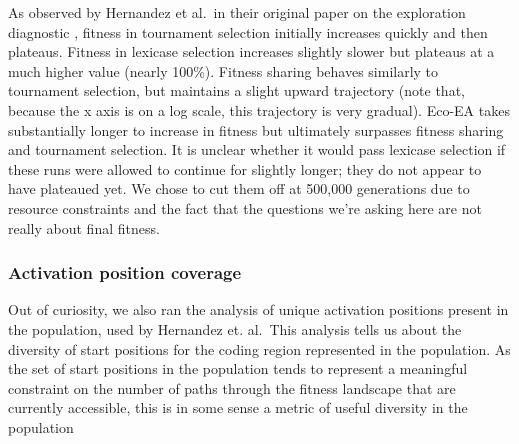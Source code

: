 \documentclass[]{book}
\begin{document}
As observed by Hernandez et al.~in their original paper on the exploration diagnostic \citep{hernandez_ExplorationExplorationMeasuring_2021}, fitness in tournament selection initially increases quickly and then plateaus. Fitness in lexicase selection increases slightly slower but plateaus at a much higher value (nearly 100\%). Fitness sharing behaves similarly to tournament selection, but maintains a slight upward trajectory (note that, because the x axis is on a log scale, this trajectory is very gradual). Eco-EA takes substantially longer to increase in fitness but ultimately surpasses fitness sharing and tournament selection. It is unclear whether it would pass lexicase selection if these runs were allowed to continue for slightly longer; they do not appear to have plateaued yet. We chose to cut them off at 500,000 generations due to resource constraints and the fact that the questions we're asking here are not really about final fitness.

\hypertarget{activation-position-coverage}{%
\subsubsection{Activation position coverage}\label{activation-position-coverage}}

Out of curiosity, we also ran the analysis of unique activation positions present in the population, used by Hernandez et. al.~This analysis tells us about the diversity of start positions for the coding region represented in the population. As the set of start positions in the population tends to represent a meaningful constraint on the number of paths through the fitness landscape that are currently accessible, this is in some sense a metric of useful diversity in the population
\end{document}
